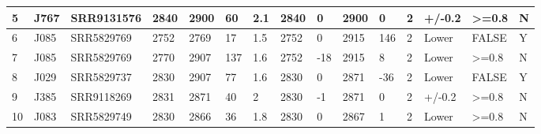\documentclass{article}
\begin{document}
{\begin{landscape}
\begin{table}[]
{\begin{tabular}{lllllllllllllll}
\multicolumn{1}{|l|}{5} & \multicolumn{1}{l|}{J767} & \multicolumn{1}{l|}{SRR9131576} & \multicolumn{1}{l|}{2840} & \multicolumn{1}{l|}{2900} & \multicolumn{1}{l|}{60} & \multicolumn{1}{l|}{2.1} & \multicolumn{1}{l|}{2840} & \multicolumn{1}{l|}{0} & \multicolumn{1}{l|}{2900} & \multicolumn{1}{l|}{0} & \multicolumn{1}{l|}{2} & \multicolumn{1}{l|}{+/-0.2} & \multicolumn{1}{l|}{\textgreater{}=0.8} & \multicolumn{1}{l|}{N} \\ \hline
\multicolumn{1}{|l|}{6} & \multicolumn{1}{l|}{J085} & \multicolumn{1}{l|}{SRR5829769} & \multicolumn{1}{l|}{2752} & \multicolumn{1}{l|}{2769} & \multicolumn{1}{l|}{17} & \multicolumn{1}{l|}{1.5} & \multicolumn{1}{l|}{2752} & \multicolumn{1}{l|}{0} & \multicolumn{1}{l|}{2915} & \multicolumn{1}{l|}{146} & \multicolumn{1}{l|}{2} & \multicolumn{1}{l|}{Lower} & \multicolumn{1}{l|}{FALSE} & \multicolumn{1}{l|}{Y} \\ \hline
\multicolumn{1}{|l|}{7} & \multicolumn{1}{l|}{J085} & \multicolumn{1}{l|}{SRR5829769} & \multicolumn{1}{l|}{2770} & \multicolumn{1}{l|}{2907} & \multicolumn{1}{l|}{137} & \multicolumn{1}{l|}{1.6} & \multicolumn{1}{l|}{2752} & \multicolumn{1}{l|}{-18} & \multicolumn{1}{l|}{2915} & \multicolumn{1}{l|}{8} & \multicolumn{1}{l|}{2} & \multicolumn{1}{l|}{Lower} & \multicolumn{1}{l|}{\textgreater{}=0.8} & \multicolumn{1}{l|}{N} \\ \hline
\multicolumn{1}{|l|}{8} & \multicolumn{1}{l|}{J029} & \multicolumn{1}{l|}{SRR5829737} & \multicolumn{1}{l|}{2830} & \multicolumn{1}{l|}{2907} & \multicolumn{1}{l|}{77} & \multicolumn{1}{l|}{1.6} & \multicolumn{1}{l|}{2830} & \multicolumn{1}{l|}{0} & \multicolumn{1}{l|}{2871} & \multicolumn{1}{l|}{-36} & \multicolumn{1}{l|}{2} & \multicolumn{1}{l|}{Lower} & \multicolumn{1}{l|}{FALSE} & \multicolumn{1}{l|}{Y} \\ \hline
\multicolumn{1}{|l|}{9} & \multicolumn{1}{l|}{J385} & \multicolumn{1}{l|}{SRR9118269} & \multicolumn{1}{l|}{2831} & \multicolumn{1}{l|}{2871} & \multicolumn{1}{l|}{40} & \multicolumn{1}{l|}{2} & \multicolumn{1}{l|}{2830} & \multicolumn{1}{l|}{-1} & \multicolumn{1}{l|}{2871} & \multicolumn{1}{l|}{0} & \multicolumn{1}{l|}{2} & \multicolumn{1}{l|}{+/-0.2} & \multicolumn{1}{l|}{\textgreater{}=0.8} & \multicolumn{1}{l|}{N} \\ \hline
\multicolumn{1}{|l|}{10} & \multicolumn{1}{l|}{J083} & \multicolumn{1}{l|}{SRR5829749} & \multicolumn{1}{l|}{2830} & \multicolumn{1}{l|}{2866} & \multicolumn{1}{l|}{36} & \multicolumn{1}{l|}{1.8} & \multicolumn{1}{l|}{2830} & \multicolumn{1}{l|}{0} & \multicolumn{1}{l|}{2867} & \multicolumn{1}{l|}{1} & \multicolumn{1}{l|}{2} & \multicolumn{1}{l|}{Lower} & \multicolumn{1}{l|}{\textgreater{}=0.8} & \multicolumn{1}{l|}{N} \\ \hline

\end{tabular}}
\end{table}
\end{landscape}}
\end{document}

